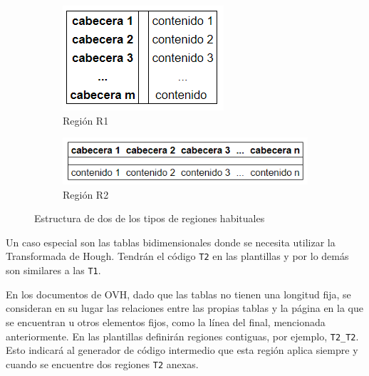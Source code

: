 \begin{figure}
    \centering
    \begin{subfigure}[b]{0.34\textwidth}
        \centering
        \includegraphics[width=\textwidth]{imaxes/g-analisis/region-r1}
        \caption{Región R1}
        \label{fig:region-r1}
    \end{subfigure}
    \hfill
    \begin{subfigure}[b]{0.65\textwidth}
        \centering
        \includegraphics[width=\textwidth]{imaxes/g-analisis/region-r2}
        \caption{Región R2}
        \label{fig:region-r2}
    \end{subfigure}
    \caption{Estructura de dos de los tipos de regiones habituales}
    \label{fig:tipos-de-regiones}
\end{figure}

Un caso especial son las tablas bidimensionales donde se necesita utilizar la Transformada de Hough. Tendrán el código \verb|T2| en las plantillas y por lo demás son similares a las \verb|T1|.

En los documentos de OVH, dado que las tablas no tienen una longitud fija, se consideran en su lugar las relaciones entre las propias tablas y la página en la que se encuentran u otros elementos fijos, como la línea del final, mencionada anteriormente. En las plantillas definirán regiones contiguas, por ejemplo, \verb|T2_T2|. Esto indicará al generador de código intermedio que esta región aplica siempre y cuando se encuentre dos regiones \verb|T2| anexas.

